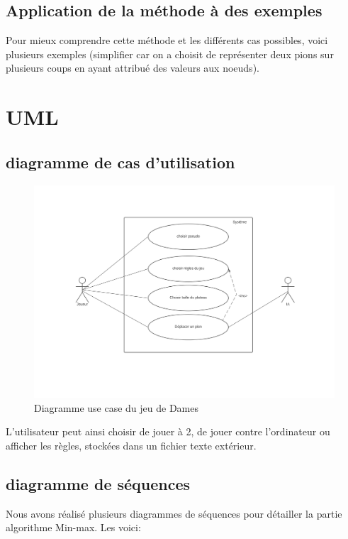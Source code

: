 \documentclass[12,french]{report}
\begin{document}
\section{Application de la méthode à des exemples}

Pour mieux comprendre cette méthode et les différents cas possibles,
voici plusieurs exemples (simplifier car on a choisit de représenter
deux pions sur plusieurs coups en ayant attribué des valeurs aux noeuds).

\chapter{UML}

\section{diagramme de cas d'utilisation}

\begin{figure}[H]
	\center
	\includegraphics[width=1\textwidth]{./Images/Diagramme_use_case}
	\caption{Diagramme use case du jeu de Dames}
\end{figure}\vspace{0.2cm}

L'utilisateur peut ainsi choisir de jouer à 2, de jouer contre l'ordinateur
ou afficher les règles, stockées dans un fichier texte extérieur.

\section{diagramme de séquences}

Nous avons réalisé plusieurs diagrammes de séquences pour détailler
la partie algorithme Min-max. Les voici:
\end{document}
